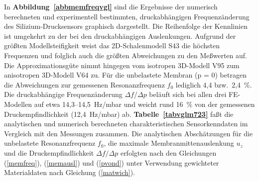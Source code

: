 In {\bf Abbildung~\ref{abbmemfreqvgl}} sind die Ergebnisse
der numerisch berechneten und experimentell bestimmten, druckabhängigen
Frequenzänderung des Silizium-Drucksensors graphisch dargestellt.
Die Reihenfolge der Kennlinien ist umgekehrt zu der bei den druckabhängigen
Auslenkungen. Aufgrund der größten Modellsteifigkeit weist das
2D-Schalenmodell S43 die höchsten Frequenzen und folglich auch die größten
Abweichungen zu den Meßwerten auf. Die Approximationsgüte nimmt hingegen
vom isotropen 3D-Modell V95 zum anisotropen 3D-Modell V64 zu. Für die
unbelastete Membran (p = 0) betragen die Abweichungen zur gemessenen
Resonanzfrequenz $f_{0}$ lediglich 4,4 bzw.\ 2,4~\%. Die druckabhängige
Frequenzänderung $\Delta f$/$\Delta p$ beläuft sich bei allen drei
FE-Modellen auf etwa 14,3--14,5~Hz/mbar und weicht rund 16~\% von der
gemessenen Druckempfindlichkeit (12,4~Hz/mbar) ab.
{\bf Tabelle~\ref{tabvglm723}} faßt die analytischen und numerisch
berechneten charakteristischen Sensorkenndaten im Vergleich
mit den Messungen zusammen. Die analytischen Abschätzungen für die
unbelastete Resonanzfrequenz $f_{0}$,
die maximale Membranmittenauslenkung $u_{z}$ und
die Druckempfindlichkeit $\Delta f / \Delta p$ erfolgten nach den
Gleichungen (\ref{memfreq}), (\ref{memausl}) und (\ref{pvond}) unter
Verwendung gewichteter Materialdaten nach Gleichung (\ref{matwich}).
